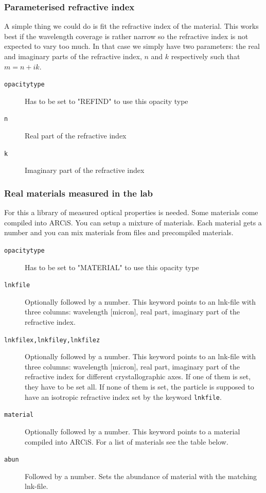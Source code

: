\documentclass[12pt]{article}
\begin{document}
\subsubsection*{Parameterised refractive index}

A simple thing we could do is fit the refractive index of the material. This works best if the wavelength coverage is rather narrow so the refractive index is not expected to vary too much. In that case we simply have two parameters: the real and imaginary parts of the refractive index, $n$ and $k$ respectively such that $m=n+ik$.

\begin{description}
\item[\texttt{opacitytype}]
Has to be set to "REFIND" to use this opacity type
\item[\texttt{n}]
Real part of the refractive index
\item[\texttt{k}]
Imaginary part of the refractive index
\end{description}

\subsubsection*{Real materials measured in the lab}

For this a library of measured optical properties is needed. Some materials come compiled into ARCiS. You can setup a mixture of materials. Each material gets a number and you can mix materials from files and precompiled materials.

\begin{description}
\item[\texttt{opacitytype}]
Has to be set to "MATERIAL" to use this opacity type
\item[\texttt{lnkfile}]
Optionally followed by a number. This keyword points to an lnk-file with three columns: wavelength [micron], real part, imaginary part of the refractive index.
\item[\texttt{lnkfilex,lnkfiley,lnkfilez}]
Optionally followed by a number. This keyword points to an lnk-file with three columns: wavelength [micron], real part, imaginary part of the refractive index for different crystallographic axes. If one of them is set, they have to be set all. If none of them is set, the particle is supposed to have an isotropic refractive index set by the keyword \texttt{lnkfile}.
\item[\texttt{material}]
Optionally followed by a number. This keyword points to a material compiled into ARCiS. For a list of materials see the table below.
\item[\texttt{abun}]
Followed by a number. Sets the abundance of material with the matching lnk-file.
\end{description}
\end{document}
